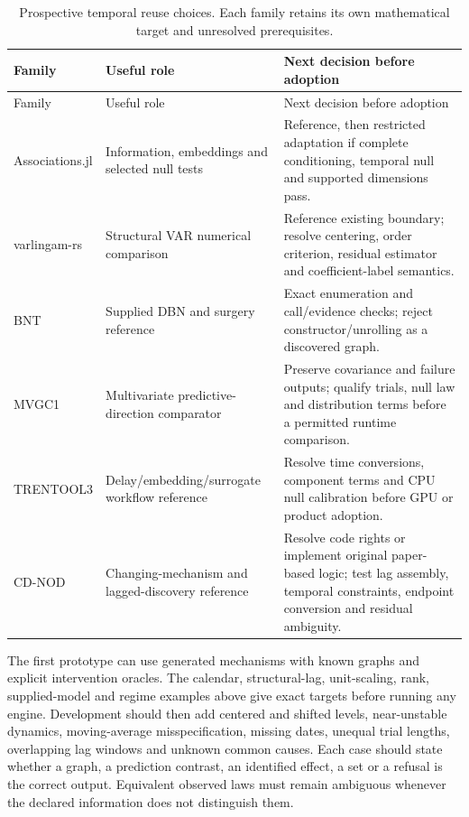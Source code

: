 \begingroup\small
\begin{longtable}{@{}P{.19\linewidth}P{.36\linewidth}P{.37\linewidth}@{}}
\caption{Prospective temporal reuse choices. Each family retains its own
mathematical target and unresolved prerequisites.}
\label{tab:exec17-temporal-choice}\\
\toprule Family & Useful role & Next decision before adoption\\
\midrule\endfirsthead
\toprule Family & Useful role & Next decision before adoption\\
\midrule\endhead
Associations.jl & Information, embeddings and selected null tests &
Reference, then restricted adaptation if complete conditioning, temporal null
and supported dimensions pass.\\
varlingam-rs & Structural VAR numerical comparison &
Reference existing boundary; resolve centering, order criterion, residual
estimator and coefficient-label semantics.\\
BNT & Supplied DBN and surgery reference &
Exact enumeration and call/evidence checks; reject constructor/unrolling as
a discovered graph.\\
MVGC1 & Multivariate predictive-direction comparator &
Preserve covariance and failure outputs; qualify trials, null law and
distribution terms before a permitted runtime comparison.\\
TRENTOOL3 & Delay/embedding/surrogate workflow reference &
Resolve time conversions, component terms and CPU null calibration before
GPU or product adoption.\\
CD-NOD & Changing-mechanism and lagged-discovery reference &
Resolve code rights or implement original paper-based logic; test lag
assembly, temporal constraints, endpoint conversion and residual ambiguity.\\
\bottomrule
\end{longtable}
\endgroup

The first prototype can use generated mechanisms with known graphs and
explicit intervention oracles. The calendar, structural-lag, unit-scaling,
rank, supplied-model and regime examples above give exact targets before
running any engine. Development should then add centered and shifted
levels, near-unstable dynamics, moving-average misspecification, missing
dates, unequal trial lengths, overlapping lag windows and unknown common
causes. Each case should state whether a graph, a prediction contrast, an
identified effect, a set or a refusal is the correct output. Equivalent
observed laws must remain ambiguous whenever the declared information
does not distinguish them.
\citep{exec17_temporal_contract}

